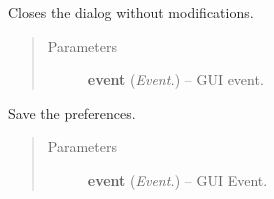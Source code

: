 \documentclass[letterpaper,10pt,english]{sphinxmanual}
\begin{document}
\begin{fulllineitems}
\begin{fulllineitems}
\label{api:wos.PreferencesDialog.openConfig}
Closes the dialog without modifications.
\begin{quote}\begin{description}
\item[{Parameters}] \leavevmode
\textbf{event} (\emph{Event.}) -- GUI event.

\end{description}\end{quote}

\end{fulllineitems}


\begin{fulllineitems}
\label{api:wos.PreferencesDialog.savePreferences}
Save the preferences.
\begin{quote}\begin{description}
\item[{Parameters}] \leavevmode
\textbf{event} (\emph{Event.}) -- GUI Event.

\end{description}\end{quote}

\end{fulllineitems}


\end{fulllineitems}

\end{document}
